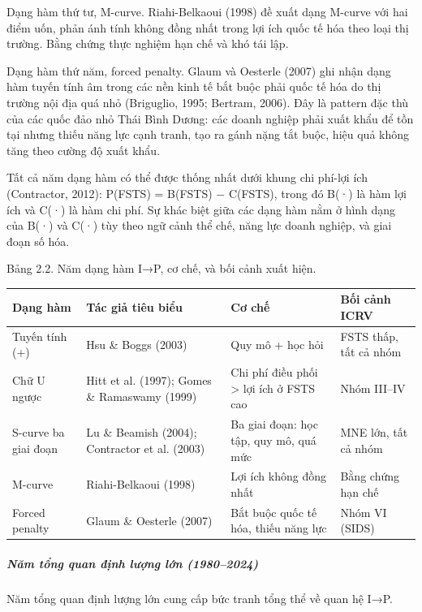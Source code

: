 \documentclass[12pt,a4paper]{article}
\begin{document}
Dạng hàm thứ tư, M-curve. Riahi-Belkaoui (1998) đề xuất dạng M-curve với
hai điểm uốn, phản ánh tính không đồng nhất trong lợi ích quốc tế hóa
theo loại thị trường. Bằng chứng thực nghiệm hạn chế và khó tái lập.

Dạng hàm thứ năm, forced penalty. Glaum và Oesterle (2007) ghi nhận dạng
hàm tuyến tính âm trong các nền kinh tế bắt buộc phải quốc tế hóa do thị
trường nội địa quá nhỏ (Briguglio, 1995; Bertram, 2006). Đây là pattern
đặc thù của các quốc đảo nhỏ Thái Bình Dương: các doanh nghiệp phải xuất
khẩu để tồn tại nhưng thiếu năng lực cạnh tranh, tạo ra gánh nặng tắt
buộc, hiệu quả không tăng theo cường độ xuất khẩu.

Tất cả năm dạng hàm có thể được thống nhất dưới khung chi phí-lợi ích
(Contractor, 2012): P(FSTS) = B(FSTS) − C(FSTS), trong đó B(·) là hàm
lợi ích và C(·) là hàm chi phí. Sự khác biệt giữa các dạng hàm nằm ở
hình dạng của B(·) và C(·) tùy theo ngữ cảnh thể chế, năng lực doanh
nghiệp, và giai đoạn số hóa.

Bảng 2.2. Năm dạng hàm I→P, cơ chế, và bối cảnh xuất hiện.

\begin{longtable}[]{@{}llll@{}}
\toprule\noalign{}
Dạng hàm & Tác giả tiêu biểu & Cơ chế & Bối cảnh ICRV \\
\midrule\noalign{}
\endhead
\bottomrule\noalign{}
\endlastfoot
Tuyến tính (+) & Hsu \& Boggs (2003) & Quy mô + học hỏi & FSTS thấp, tất
cả nhóm \\
Chữ U ngược & Hitt et al. (1997); Gomes \& Ramaswamy (1999) & Chi phí
điều phối \textgreater{} lợi ích ở FSTS cao & Nhóm III--IV \\
S-curve ba giai đoạn & Lu \& Beamish (2004); Contractor et al. (2003) &
Ba giai đoạn: học tập, quy mô, quá mức & MNE lớn, tất cả nhóm \\
M-curve & Riahi-Belkaoui (1998) & Lợi ích không đồng nhất & Bằng chứng
hạn chế \\
Forced penalty & Glaum \& Oesterle (2007) & Bắt buộc quốc tế hóa, thiếu
năng lực & Nhóm VI (SIDS) \\
\end{longtable}

\hypertarget{nux103m-tux1ed5ng-quan-ux111ux1ecbnh-lux1b0ux1ee3ng-lux1edbn-19802024}{%
\subparagraph{Năm tổng quan định lượng lớn
(1980--2024)}\label{nux103m-tux1ed5ng-quan-ux111ux1ecbnh-lux1b0ux1ee3ng-lux1edbn-19802024}}

Năm tổng quan định lượng lớn cung cấp bức tranh tổng thể về quan hệ I→P.
\end{document}
